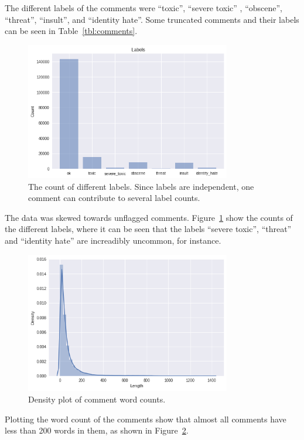 The different labels of the comments were ``toxic'', ``severe toxic'' ,
``obscene'', ``threat'', ``insult'', and ``identity hate''. Some
truncated comments and their labels can be seen in
Table~\ref{tbl:comments}. 
\begin{figure}[H]
  \centering
  \includegraphics[width=0.8\textwidth]{graphics/label-dist}
  \caption{The count of different labels. Since labels are independent,
    one comment can contribute to several label counts.}\label{fig:labels-dist}
\end{figure}
The data was skewed towards unflagged comments. Figure~\ref{fig:labels-dist} show the counts of the
different labels, where it can be seen that the labels ``severe
toxic'', ``threat'' and ``identity hate'' are increadibly uncommon,
for instance.
\begin{figure}[H]
  \centering
  \includegraphics[width=0.8\textwidth]{graphics/comment-word-count}
  \caption{Density plot of comment word counts.}\label{fig:comment-word-count}
\end{figure}
Plotting the word count of the comments show that almost all comments
have less than 200 words in them, as shown in Figure~\ref{fig:comment-word-count}.
